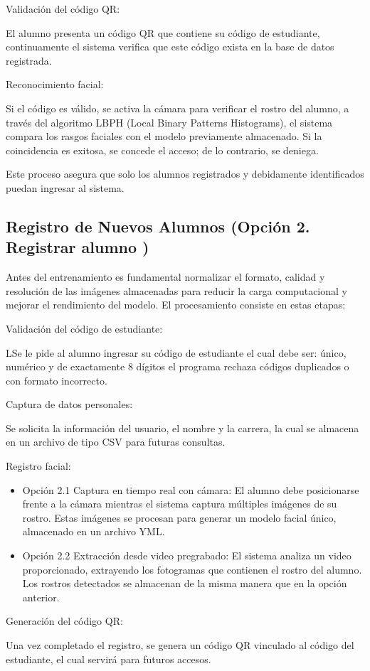 \documentclass[12pt]{article}
\begin{document}
{\begin{itemize}
	{\bfseries\item Validación del código QR:\par}
    {\normalsize El alumno presenta un código QR que contiene su código de estudiante, continuamente el sistema verifica que este código exista en la base de datos registrada.}

    {\bfseries\item Reconocimiento facial:\par}
    {\normalsize Si el código es válido, se activa la cámara para verificar el rostro del alumno, a través del algoritmo LBPH (Local Binary Patterns Histograms), el sistema compara los rasgos faciales con el modelo previamente almacenado. Si la coincidencia es exitosa, se concede el acceso; de lo contrario, se deniega.}
\end{itemize}
Este proceso asegura que solo los alumnos registrados y debidamente identificados puedan ingresar al sistema.

\subsection{Registro de Nuevos Alumnos (Opción 2. Registrar alumno )}
Antes del entrenamiento es fundamental normalizar el formato, calidad y resolución de las imágenes almacenadas para reducir la carga computacional y mejorar el rendimiento del modelo. El procesamiento consiste en estas etapas:

\begin{itemize}
	{\bfseries\item Validación del código de estudiante:} LSe le pide al alumno ingresar su código de estudiante el cual debe ser: único, numérico y de exactamente 8 dígitos el programa rechaza códigos duplicados o con formato incorrecto.
	{\bfseries\item Captura de datos personales:} Se solicita la información del usuario, el nombre y la carrera, la cual se almacena en un archivo de tipo CSV para futuras consultas.
	{\bfseries\item Registro facial:} 
    \begin{itemize}
        \item Opción 2.1 Captura en tiempo real con cámara: El alumno debe posicionarse frente a la cámara mientras el sistema captura múltiples imágenes de su rostro. Estas imágenes se procesan para generar un modelo facial único, almacenado en un archivo YML.
        \item Opción 2.2 Extracción desde video pregrabado: El sistema analiza un video proporcionado, extrayendo los fotogramas que contienen el rostro del alumno. Los rostros detectados se almacenan de la misma manera que en la opción anterior.
    \end{itemize}
    {\bfseries\item Generación del código QR:} Una vez completado el registro, se genera un código QR vinculado al código del estudiante, el cual servirá para futuros accesos.
\end{itemize}

}
\end{document}

